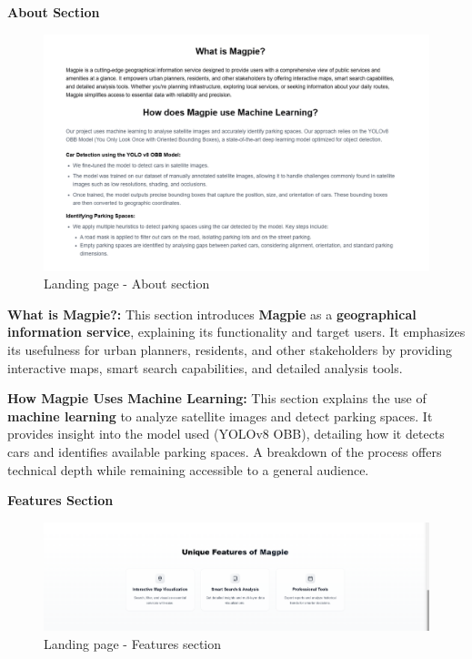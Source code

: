 \newpage{}

\textbf{About Section}

\begin{figure}[htbp]
    \centering{}
    \includegraphics[width=1\textwidth]{images/site/landing/landing_2_about.png}
    \caption{Landing page {-} About section}
\end{figure}

\textbf{What is Magpie?:} This section introduces \textbf{Magpie} as a
\textbf{geographical information service}, explaining its functionality and
target users. It emphasizes its usefulness for urban planners, residents, and
other stakeholders by providing interactive maps, smart search capabilities, and
detailed analysis tools.

\textbf{How Magpie Uses Machine Learning:} This section explains the use of
\textbf{machine learning} to analyze satellite images and detect parking spaces.
It provides insight into the model used (YOLOv8 OBB), detailing how it detects
cars and identifies available parking spaces. A breakdown of the process offers
technical depth while remaining accessible to a general audience.

\newpage{}

\textbf{Features Section}

\begin{figure}[htbp]
    \centering{}
    \includegraphics[width=1\textwidth]{images/site/landing/landing_3_features.png}
    \caption{Landing page {-} Features section}
\end{figure}

